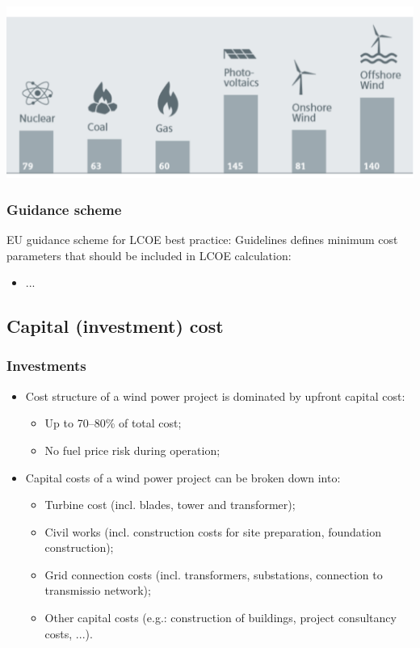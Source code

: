 \documentclass{article}
\begin{document}
\begin{center}
    \includegraphics[width=.8\textwidth]{media/energy_lcoe.png}
\end{center}

\subsubsection{Guidance scheme}
EU guidance scheme for LCOE best practice:
Guidelines defines minimum cost parameters that should be included in LCOE calculation:
\begin{itemize}
    \item ...
\end{itemize}

\subsection{Capital (investment) cost}
\subsubsection{Investments}
\begin{itemize}
    \item Cost structure of a wind power project is dominated by upfront capital cost:
    \begin{itemize}[label=$\circ$]
        \item Up to 70--80\% of total cost;
        \item No fuel price risk during operation;
    \end{itemize}
    \item Capital costs of a wind power project can be broken down into:
    \begin{itemize}[label=$\circ$]
        \item Turbine cost (incl. blades, tower and transformer);
        \item Civil works (incl. construction costs for site preparation, foundation construction);
        \item Grid connection costs (incl. transformers, substations, connection to transmissio network);
        \item Other capital costs (e.g.: construction of buildings, project consultancy costs, ...).
    \end{itemize}
\end{itemize}
\end{document}
